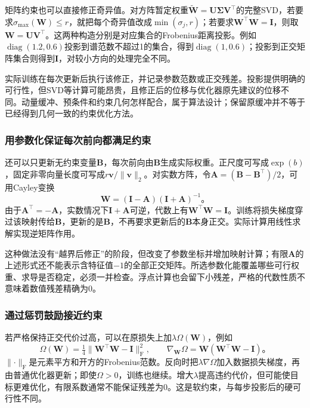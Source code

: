 矩阵约束也可以直接修正奇异值。对方阵暂定权重$\tilde{\bm W}=\bm U\bm\Sigma\bm V^{\top}$的完整SVD，若要求$\sigma_{\max}(\bm W)\leq r$，就把每个奇异值改成$\min(\sigma_j,r)$；若要求$\bm W^{\top}\bm W=\bm I$，则取$\bm W=\bm U\bm V^{\top}$。这两种构造分别是对应集合的Frobenius距离投影。例如$\operatorname{diag}(1.2,0.6)$投影到谱范数不超过1的集合，得到$\operatorname{diag}(1,0.6)$；投影到正交矩阵集合则得到$\bm I$，对较小方向的处理完全不同。

实际训练在每次更新后执行该修正，并记录参数范数或正交残差。投影提供明确的可行性，但SVD等计算可能昂贵，且修正后的位移与优化器原先建议的位移不同。动量缓冲、预条件和约束几何怎样配合，属于算法设计；保留原缓冲并不等于已经得到几何一致的约束优化方法。

\subsubsection{用参数化保证每次前向都满足约束}

还可以只更新无约束变量$\bm B$，每次前向由$\bm B$生成实际权重。正尺度可写成$\exp(b)$，固定非零向量长度可写成$r\bm v/\lVert\bm v\rVert_2$。对实数方阵，令$\bm A=(\bm B-\bm B^{\top})/2$，可用Cayley变换
\begin{equation}
  \bm W=(\bm I-\bm A)(\bm I+\bm A)^{-1}\text{。}
  \label{eq:training-cayley-parameterization}
\end{equation}
由于$\bm A^{\top}=-\bm A$，实数情况下$\bm I+\bm A$可逆，代数上有$\bm W^{\top}\bm W=\bm I$。训练将损失梯度穿过该映射传给$\bm B$，更新的是$\bm B$，不再要求更新后的$\bm B$本身正交。实际计算用线性求解实现逆矩阵作用。

这种做法没有“越界后修正”的阶段，但改变了参数坐标并增加映射计算；有限$\bm A$的上述形式还不能表示含特征值$-1$的全部正交矩阵。所选参数化能覆盖哪些可行权重、求导是否稳定，必须一并检查。浮点计算也会留下小残差，严格的代数性质不意味着数值残差精确为0。

\subsubsection{通过惩罚鼓励接近约束}

若严格保持正交代价过高，可以在原损失上加$\lambda\Omega(\bm W)$，例如
\begin{equation}
  \Omega(\bm W)=\tfrac14\lVert\bm W^{\top}\bm W-\bm I\rVert_{\mathrm F}^2,
  \qquad\nabla_{\bm W}\Omega=\bm W(\bm W^{\top}\bm W-\bm I)\text{。}
  \label{eq:training-orthogonality-penalty}
\end{equation}
$\lVert\cdot\rVert_{\mathrm F}$是元素平方和开方的Frobenius范数。反向时把$\lambda\nabla\Omega$加入数据损失梯度，再由普通优化器更新；即使$\Omega>0$，训练也继续。增大$\lambda$提高违约代价，但可能使目标更难优化，有限系数通常不能保证残差为0。这是软约束，与每步投影后的硬可行性不同。

